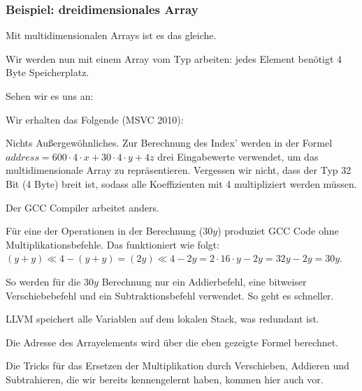 \subsubsection{Beispiel: dreidimensionales Array}

Mit multidimensionalen Arrays ist es das gleiche.

Wir werden nun mit einem Array vom Typ \Tint arbeiten: jedes Element benötigt 4 Byte Speicherplatz.

Sehen wir es uns an:




Wir erhalten das Folgende (MSVC 2010):


Nichts Außergewöhnliches. Zur Berechnung des Index' werden in der Formel $address=600 \cdot 4 \cdot x + 30 \cdot 4 \cdot
y + 4z$ drei Eingabewerte verwendet, um das multidimensionale Array zu repräsentieren.
Vergessen wir nicht, dass der \Tint Typ 32 Bit (4 Byte) breit ist, sodass alle Koeffizienten mit 4 multipliziert werden
müssen.


Der GCC Compiler arbeitet anders.

Für eine der Operationen in der Berechnung ($30y$) produziet GCC Code ohne Multiplikationsbefehle.
Das funktioniert wie folgt:
$(y+y) \ll 4 - (y+y) = (2y) \ll 4 - 2y = 2 \cdot 16 \cdot y - 2y = 32y - 2y = 30y$.

So werden für die $30y$ Berechnung nur ein Addierbefehl, eine bitweiser Verschiebebefehl und ein Subtraktionsbefehl
verwendet. So geht es schneller.




\NonOptimizing LLVM speichert alle Variablen auf dem lokalen Stack, was redundant ist.

Die Adresse des Arrayelements wird über die eben gezeigte Formel berechnet.



Die Tricks für das Ersetzen der Multiplikation durch Verschieben, Addieren und Subtrahieren, die wir bereits
kennengelernt haben, kommen hier auch vor.

